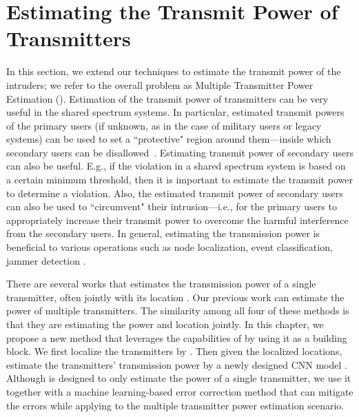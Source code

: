 \section{Estimating the Transmit Power of Transmitters}
\label{sec:power}

In this section, we extend our techniques to estimate the transmit power of the
intruders; we refer to the overall problem as  Multiple Transmitter Power Estimation (\mtpe). Estimation of the transmit power of transmitters can be very useful in the shared
spectrum systems. In particular, estimated transmit powers of the primary users (if unknown, as in the case of military users or legacy systems) can be used to set a
``protective" region around them---inside which secondary users can be disallowed~\cite{Ureten2011powerlocation}.
Estimating transmit power of secondary users can also be useful. E.g., if the violation
in a shared spectrum system is based on a certain minimum threshold, then it is important to estimate the transmit power to determine a violation. 
Also, the estimated transmit power of secondary users can also be used to ``circumvent" their intrusion---i.e., for the primary users to appropriately increase their transmit power to overcome the harmful interference from the secondary users. 
In general, estimating the transmission power is beneficial to various operations such as node localization, event classification, jammer detection \cite{PowerEstimate2010Zafer}.
 
There are several works that estimates the transmission power of a single transmitter, often jointly with its location \cite{PowerEstimate2010Zafer, Ureten2011powerlocation, icoin2007-powerposition}.
Our previous work \cite{ipsn20-mtl} can estimate the power of multiple transmitters.
The similarity among all four of these methods is that they are estimating the power and location jointly.
In this chapter, we propose a new method that leverages the capabilities of \our by using it as a building block. We first localize the transmitters by \our. 
Then given the localized locations, estimate the transmitters' transmission power by a newly designed CNN model \power. 
Although \power is designed to only estimate the power of a single transmitter, we use it together with a machine learning-based error correction method that can mitigate the errors while applying \power to the multiple transmitter power estimation scenario.

